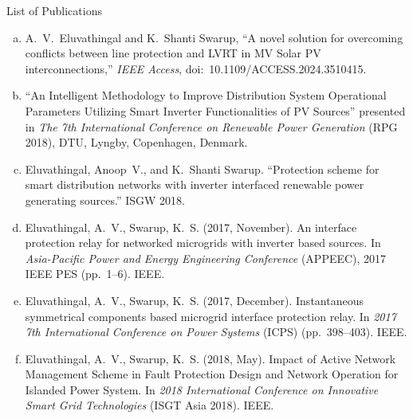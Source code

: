 \documentclass[10pt,aspectratio=169]{beamer}
\begin{document}
\begin{frame}{List of Publications}
  \begin{enumerate}[(a)]\itemsep5pt\small
    \item A.~V.~Eluvathingal and K.~Shanti Swarup, ``A novel solution for
      overcoming conflicts between line protection and LVRT in MV Solar PV
      interconnections,'' \textit{IEEE Access},
      doi:~10.1109/ACCESS.2024.3510415.

    \item ``An Intelligent Methodology to Improve Distribution System
      Operational Parameters Utilizing Smart Inverter Functionalities of
      PV Sources'' presented in \textit{The 7th International Conference on
      Renewable Power Generation} (RPG 2018), DTU, Lyngby, Copenhagen,
      Denmark.

    \item Eluvathingal, Anoop~V., and K.~Shanti Swarup.
      ``Protection scheme for smart distribution networks with inverter
      interfaced renewable power generating sources.'' ISGW 2018.

    \item Eluvathingal, A.~V., Swarup, K.~S. (2017, November).
      An interface protection relay for networked microgrids with inverter
      based sources. In \textit{Asia-Pacific Power and Energy Engineering
      Conference} (APPEEC), 2017 IEEE PES (pp.~1--6). IEEE.

    \item Eluvathingal, A.~V., Swarup, K.~S. (2017, December).
      Instantaneous symmetrical components based microgrid interface
      protection relay. In \textit{2017 7th International Conference on
      Power Systems} (ICPS) (pp.~398--403). IEEE.

    \item Eluvathingal, A.~V., Swarup, K.~S. (2018, May).
      Impact of Active Network Management Scheme in Fault Protection Design
      and Network Operation for Islanded Power System. In \textit{2018
      International Conference on Innovative Smart Grid Technologies}
      (ISGT Asia 2018). IEEE.
  \end{enumerate}
\end{frame}
\end{document}
